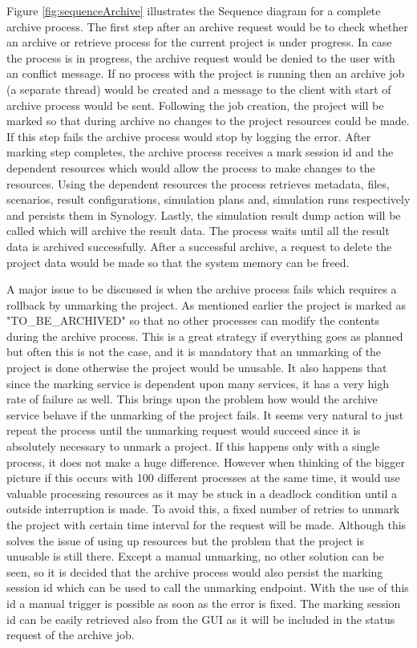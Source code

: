 Figure \ref{fig:sequenceArchive} illustrates the Sequence diagram for a complete archive process. The first step after an archive request would be to check
whether an archive or retrieve process for the current project is under progress. In case the process is in progress, the archive request would be denied to the
user with an conflict message. If no process with the project is running then an archive job (a separate thread) would be created and a message to the client with start of archive process would be
sent. Following the job creation, the project will be marked so that during archive no changes to the project resources could be made. If this step fails the archive 
process would stop by logging the error. After marking step completes, the archive process receives a mark session id and the dependent resources which would allow the process to make
changes to the resources. Using the dependent resources the process retrieves metadata, files, scenarios, result configurations, simulation plans and, simulation runs 
respectively and persists them in Synology. Lastly, the simulation result dump action will be called which will archive the result data. The process waits until
all the result data is archived successfully. After a successful archive, a request to delete the project data would be made so that the system memory can be freed.

A major issue to be discussed is when the archive process fails which requires a rollback by unmarking the project. As mentioned earlier the project is
marked as "TO\_BE\_ARCHIVED" so that no other processes can modify the contents during the archive process. This is a great strategy if everything goes as planned but 
often this is not the case, and it is mandatory that an unmarking of the project is done otherwise the project would be unusable. It also happens that since the
marking service is dependent upon many services, it has a very high rate of failure as well. This brings upon the problem how would the archive service behave if the
unmarking of the project fails. It seems very natural to just repeat the process until the unmarking request would succeed since it is absolutely necessary to unmark
a project. If this happens only with a single process, it does not make a huge difference. However when thinking of the bigger picture if this 
occurs with 100 different processes at the same time, it would use valuable processing resources as it may be stuck in a deadlock condition until a outside interruption
is made. To avoid this, a fixed number of retries to unmark the project with certain time interval for the request 
will be made. Although this solves the issue of using up resources but the problem that the project is unusable is still there. Except a manual unmarking, no other solution 
can be seen, so 
it is decided that the archive process would also persist the marking session id which can be used to call the unmarking endpoint. With the use of this id a manual 
trigger is possible as soon as the error is fixed. The marking session id can be easily retrieved also from the GUI as it will be included in the status request of
the archive job.
 